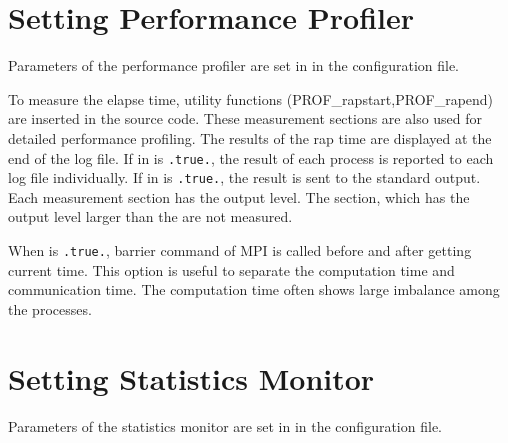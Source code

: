 \section{Setting Performance Profiler} \label{subsec:prof}

Parameters of the performance profiler are set in  in the configuration file.


\noindent
To measure the elapse time, utility functions (PROF\_rapstart,PROF\_rapend) are inserted in the source code.
These measurement sections are also used for detailed performance profiling.
%
The results of the rap time are displayed at the end of the log file.
If  in   is \verb|.true.|, the result of each process is reported to each log file individually.
If  in  is \verb|.true.|, the result is sent to the standard output.
%
Each measurement section has the output level. The section, which has the output level larger than the  are not measured.

When  is \verb|.true.|, barrier command of MPI is called before and after getting current time.
This option is useful to separate the computation time and communication time.
The computation time often shows large imbalance among the processes.



\section{Setting Statistics Monitor} \label{subsec:statistics}

Parameters of the statistics monitor are set in  in the configuration file.

